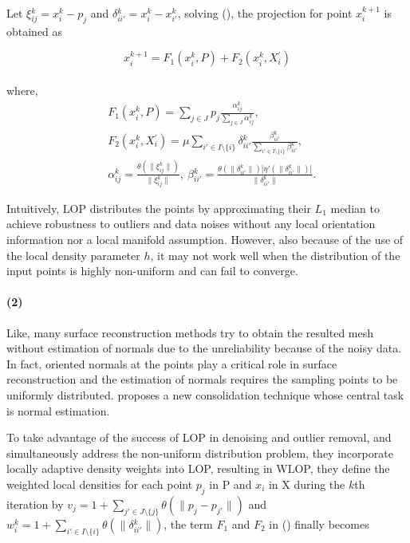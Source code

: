Let $\xi{_{ij}^k}=x{_i^k}-p_{j}$ and $\delta{_{ii'}^k}=x{_i^k}-x{_{i'}^k}$, solving (), the projection for point $x{_i^{k+1}}$ is obtained as

\small{
\begin{equation}
 \label{eq:WLOP1}
 x{_i^{k+1}}=F_1(x{_i^k},P)+F_2(x{_i^k},X{_i^{'}})
\end{equation}
}
\\
where,
\small{
\begin{equation}
 \label{eq:WLOP2}
 \begin{split}
 & F_1(x{_i^k},P)=\sum_{j\in J}^{}p_{j}\frac{\alpha{_{ij}^k}}{\sum_{j\in J}^{}\alpha{_{ij}^k}},\\
 & F_2(x{_i^k},X{_i^{'}})=\mu\sum_{{i'}\in I\setminus\{i\}}^{}\delta{_{ii'}^k}\frac{\beta{_{ii'}^k}}{\sum_{{i'}\in I\setminus\{i\}}^{}\beta{_{ii'}^k}},\\
 & \alpha{_{ij}^k}=\frac{\theta(\|\xi{_{ij}^k}\|)}{\|\xi{_{ij}^k}\|},
   ~\beta{_{ii'}^k}=\frac{\theta(\|\delta{_{ii'}^k}\|)|\eta'(\|\delta{_{ii'}^k}\|)|}{\|\delta{_{ii'}^k}\|}.
 \end{split}
\end{equation}
}

Intuitively, LOP distributes the points by approximating their $L_1$ median to achieve robustness to outliers and data noises without any local orientation information nor a local manifold assumption.
However, also because of the use of the local density parameter $h$, it may not work well when the distribution of the input points is highly non-uniform and can fail to converge.

\paragraph{(2)}
Like\cite{lipman2007parameterization}, many surface reconstruction methods try to obtain the resulted mesh without estimation of normals due to the unreliability because of the noisy data.
In fact, oriented normals at the points play a critical role in surface reconstruction and the estimation of normals requires the sampling points to be uniformly distributed.
\cite{huang2009consolidation} proposes a new consolidation technique whose central task is normal estimation.

To take advantage of the success of LOP in denoising and outlier removal, and simultaneously address the non-uniform distribution problem, they incorporate locally adaptive density weights into LOP, resulting in WLOP, they define the weighted local densities for each point $p_{j}$ in P and $x_{i}$ in X during the $k$th iteration by $v_{j}=1+\sum_{j'\in J\setminus\{j\}}^{}\theta(\|p_{j}-p_{j'}\|)$ and $w{_i^k}=1+\sum_{i'\in I\setminus\{i\}}^{}\theta(\|\delta{_{ii'}^k}\|)$, the term $F_1$ and $F_2$ in () finally becomes

